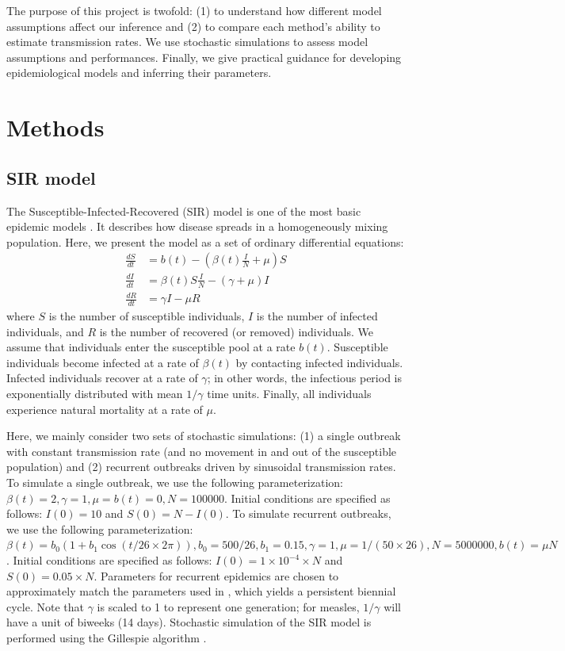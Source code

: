 \documentclass{article}
\begin{document}
The purpose of this project is twofold:
(1) to understand how different model assumptions affect our inference and
(2) to compare each method's ability to estimate transmission rates.
We use stochastic simulations to assess model assumptions and performances.
Finally, we give practical guidance for developing epidemiological models and inferring their parameters.

\section{Methods}

\subsection{SIR model}

The Susceptible-Infected-Recovered (SIR) model is one of the most basic epidemic models \citep{kermack1927contribution}.
It describes how disease spreads in a homogeneously mixing population.
Here, we present the model as a set of ordinary differential equations:
\begin{equation}\label{eq:sir}
\begin{aligned}
\frac{dS}{dt} &= b(t) - \left(\beta(t) \frac{I}{N} + \mu \right) S\\
\frac{dI}{dt} &= \beta(t) S \frac{I}{N} - (\gamma + \mu) I\\
\frac{dR}{dt} &= \gamma I - \mu R
\end{aligned}
\end{equation}
where $S$ is the number of susceptible individuals, $I$ is the number of infected individuals, and $R$ is the number of recovered (or removed) individuals.
We assume that individuals enter the susceptible pool at a rate $b(t)$.
Susceptible individuals become infected at a rate of $\beta(t)$ by contacting infected individuals.
Infected individuals recover at a rate of $\gamma$;
in other words, the infectious period is exponentially distributed with mean $1/\gamma$ time units.
Finally, all individuals experience natural mortality at a rate of $\mu$.

Here, we mainly consider two sets of stochastic simulations: (1) a single outbreak with constant transmission rate (and no movement in and out of the susceptible population) and (2) recurrent outbreaks driven by sinusoidal transmission rates.
To simulate a single outbreak, we use the following parameterization: $\beta(t) = 2, \gamma=1, \mu=b(t) = 0, N=100000$.
Initial conditions are specified as follows: $I(0) = 10$ and $S(0) = N - I(0)$.
To simulate recurrent outbreaks, we use the following parameterization: $\beta(t) = b_0 (1 + b_1 \cos (t/26 \times 2\pi)), b_0 = 500/26, b_1 = 0.15, \gamma = 1, \mu=1/(50 \times 26), N=5000000, b(t) = \mu N$. 
Initial conditions are specified as follows: $I(0) = 1 \times 10^{-4} \times N$ and $S(0) = 0.05 \times N$.
Parameters for recurrent epidemics are chosen to approximately match the parameters used in \cite{earn1998persistence}, which yields a persistent biennial cycle.
Note that $\gamma$ is scaled to 1 to represent one generation; for measles, $1/\gamma$ will have a unit of biweeks (14 days).
Stochastic simulation of the SIR model is performed using the Gillespie algorithm \citep{gillespie1976general}.
\end{document}
